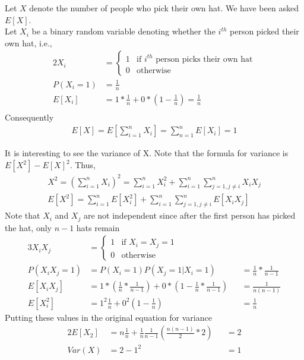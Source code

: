 \documentclass[../../probability-notes.tex]{subfile}
\begin{document}
        Let $X$ denote the number of people who pick their own hat. We have been asked $E[X]$.\\
        Let $X_{i}$ be a binary random variable denoting whether the $i^{th}$ person picked their own hat, i.e.,
        \begin{alignat*}{2}
            X_{i} &= \begin{cases} 1 &\mbox{if $i^{th}$ person picks their own hat}\\ 
                                    0 &\mbox{otherwise} \end{cases} \\
            P(X_{i} = 1) &= \frac{1}{n} \\
            E[X_{i}] &= 1 * \frac{1}{n} + 0 * (1 - \frac{1}{n}) = \frac{1}{n}\\
        \end{alignat*}
        Consequently
        \begin{align*}
            E[X] = E[\sum_{i=1}^{n} X_{i}] = \sum_{n=1}^{n}E[X_{i}] = 1
        \end{align*}

        It is interesting to see the variance of X. Note that the formula for variance is $E[X^{2}] - E[X]^{2}$. Thus,
        \begin{align*}
            X^{2} = (\sum_{i=1}^{n} X_{i})^{2} = \sum_{i=1}^{n} X_{i}^{2} + \sum_{i=1}^{n} \sum_{j=1, j\neq i}^{n} X_{i}X{_j} \\
            E[X^{2}] = \sum_{i=1}^{n}E[X_{i}^{2}] + \sum_{i=1}^{n} \sum_{j=1, j\neq i}^{n} E[X_{i}X{_j}] 
        \end{align*}
        Note that $X_{i}$ and $X_{j}$ are not independent since after the first person has picked the hat, only $n-1$ hats remain
        \begin{alignat*}{3}
            X_{i}X_{j} &= \begin{cases} 1 &\mbox{if $X_{i} = X_{j} = 1$}\\
                                       0 &\mbox{otherwise} \end{cases} \\
            P(X_{i}X_{j} = 1) &= P(X_{i} = 1) P(X_{j} = 1|X_{i} = 1) &&= \frac{1}{n} * \frac{1}{n-1}\\
            E[X_{i}X_{j}] &= 1 * (\frac{1}{n} * \frac{1}{n-1}) + 0 * (1 - \frac{1}{n} * \frac{1}{n-1}) &&= \frac{1}{n(n-1)}\\
            E[X_{i}^2] &= 1^{2} \frac{1}{n} + 0^{2} (1-\frac{1}{n}) &&= \frac{1}{n}
        \end{alignat*}
        Putting these values in the original equation for variance
        \begin{alignat*}{2}
            E[X_{2}] &= n \frac{1}{n} + \frac{1}{n} \frac{1}{n-1} (\frac{n(n-1)}{2} * 2) &&= 2\\
            Var(X) &= 2 - 1^{2} &&= 1
        \end{alignat*}
\end{document}
